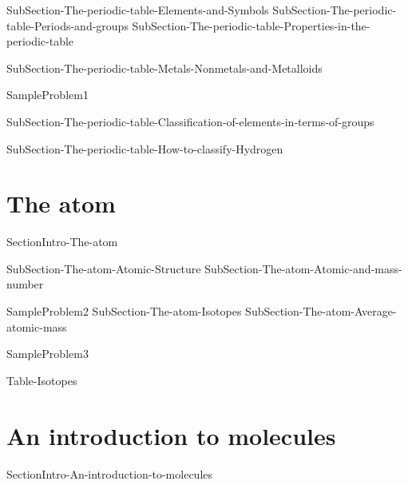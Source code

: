 \documentclass[main.tex]{subfiles}
\begin{document}
\sloppy
\begin{description}
{SubSection-The-periodic-table-Elements-and-Symbols}
{SubSection-The-periodic-table-Periods-and-groups}
{SubSection-The-periodic-table-Properties-in-the-periodic-table}

{SubSection-The-periodic-table-Metals-Nonmetals-and-Metalloids}




{SampleProblem1}


{SubSection-The-periodic-table-Classification-of-elements-in-terms-of-groups}


{SubSection-The-periodic-table-How-to-classify-Hydrogen}


 \end{description}








\section{The atom}
{SectionIntro-The-atom}




   
\sloppy
\begin{description}
{SubSection-The-atom-Atomic-Structure}
{SubSection-The-atom-Atomic-and-mass-number}


 
 



{SampleProblem2}
{SubSection-The-atom-Isotopes}
{SubSection-The-atom-Average-atomic-mass}






{SampleProblem3}


 {Table-Isotopes}




\end{description}







\section{An introduction to molecules}
{SectionIntro-An-introduction-to-molecules}
\end{document}

